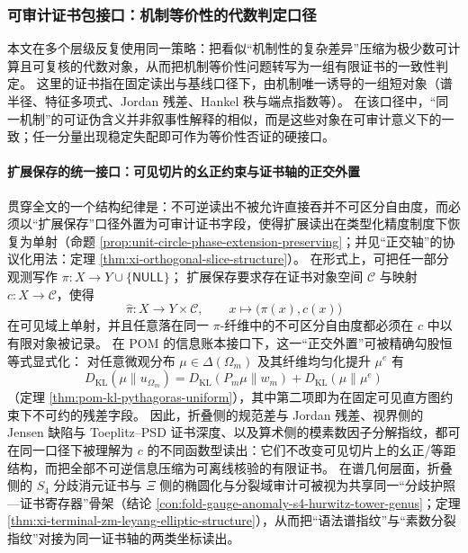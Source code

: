 \subsubsection{可审计证书包接口：机制等价性的代数判定口径}\label{subsubsec:discussion-audit-certificate-pack}
本文在多个层级反复使用同一策略：把看似“机制性的复杂差异”压缩为极少数可计算且可复核的代数对象，从而把机制等价性问题转写为一组有限证书的一致性判定。
这里的证书指在固定读出与基线口径下，由机制唯一诱导的一组短对象（谱半径、特征多项式、Jordan 残差、Hankel 秩与端点指数等）。
在该口径中，“同一机制”的可证伪含义并非叙事性解释的相似，而是这些对象在可审计意义下的一致；任一分量出现稳定失配即可作为等价性否证的硬接口。

\paragraph{扩展保存的统一接口：可见切片的幺正约束与证书轴的正交外置}
贯穿全文的一个结构纪律是：不可逆读出不被允许直接吞并不可区分自由度，而必须以“扩展保存”口径外置为可审计证书字段，使得扩展读出在类型化精度制度下恢复为单射（命题 \ref{prop:unit-circle-phase-extension-preserving}；并见“正交轴”的协议化用法：定理 \ref{thm:xi-orthogonal-slice-structure}）。
在形式上，可把任一部分观测写作
\(
\pi:X\to Y\cup\{\mathsf{NULL}\}
\)；
扩展保存要求存在证书对象空间 \(\mathcal C\) 与映射 \(c:X\to\mathcal C\)，使得
\[
\widehat\pi:X\to Y\times\mathcal C,\qquad x\longmapsto\bigl(\pi(x),c(x)\bigr)
\]
在可见域上单射，并且任意落在同一 \(\pi\)-纤维中的不可区分自由度都必须在 \(c\) 中以有限对象被记录。
在 POM 的信息账本接口下，这一“正交外置”可被精确勾股恒等式显式化：
对任意微观分布 \(\mu\in\Delta(\Omega_m)\) 及其纤维均匀化提升 \(\mu^e\) 有
\[
D_{\mathrm{KL}}(\mu\|u_{\Omega_m})
=D_{\mathrm{KL}}(P_m\mu\|w_m)+D_{\mathrm{KL}}(\mu\|\mu^e)
\]
（定理 \ref{thm:pom-kl-pythagoras-uniform}），其中第二项即为在固定可见直方图约束下不可约的残差字段。
因此，折叠侧的规范差与 Jordan 残差、视界侧的 Jensen 缺陷与 Toeplitz--PSD 证书深度、以及算术侧的模素数因子分解指纹，都可在同一口径下被理解为 \(c\) 的不同函数型读出：它们不改变可见切片上的幺正/等距结构，而把全部不可逆信息压缩为可离线核验的有限证书。
在谱几何层面，折叠侧的 \(S_4\) 分歧消元证书与 \(\Xi\) 侧的椭圆化与分裂域审计可被视为共享同一“分歧护照—证书寄存器”骨架（结论 \ref{con:fold-gauge-anomaly-s4-hurwitz-tower-genus}；定理 \ref{thm:xi-terminal-zm-leyang-elliptic-structure}），从而把“语法谱指纹”与“素数分裂指纹”对接为同一证书轴的两类坐标读出。

